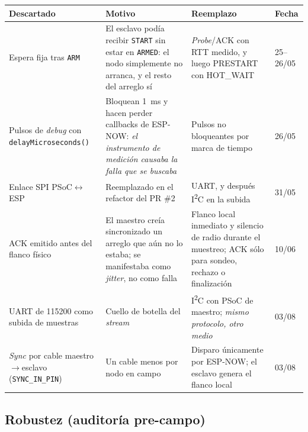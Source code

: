 \begin{center}\footnotesize
\begin{tabularx}{\textwidth}{@{}l X X l@{}}
\toprule
\textbf{Descartado} & \textbf{Motivo} & \textbf{Reemplazo} & \textbf{Fecha} \\
\midrule
Espera fija tras \texttt{ARM}
& El esclavo pod\'ia recibir \texttt{START} sin estar en \texttt{ARMED}: el nodo simplemente no arranca, y el resto del arreglo s\'i
& \emph{Probe}/ACK con RTT medido, y luego PRESTART con HOT\_WAIT
& 25--26/05 \\
\addlinespace[2pt]
Pulsos de \emph{debug} con \texttt{delayMicroseconds()}
& Bloquean \SI{1}{\milli\second} y hacen perder callbacks de ESP-NOW: \emph{el instrumento de medici\'on causaba la falla que se buscaba}
& Pulsos no bloqueantes por marca de tiempo
& 26/05 \\
\addlinespace[2pt]
Enlace SPI PSoC$\leftrightarrow$ESP
& Reemplazado en el refactor del PR \#2
& UART, y despu\'es I\textsuperscript{2}C en la subida
& 31/05 \\
\addlinespace[2pt]
ACK emitido antes del flanco f\'isico
& El maestro cre\'ia sincronizado un arreglo que a\'un no lo estaba; se manifestaba como \emph{jitter}, no como falla
& Flanco local inmediato y silencio de radio durante el muestreo; ACK s\'olo para sondeo, rechazo o finalizaci\'on
& 10/06 \\
\addlinespace[2pt]
UART de \SI{115200}{} como subida de muestras
& Cuello de botella del \emph{stream}
& I\textsuperscript{2}C con PSoC de maestro; \emph{mismo protocolo, otro medio}
& 03/08 \\
\addlinespace[2pt]
\emph{Sync} por cable maestro$\to$esclavo (\texttt{SYNC\_IN\_PIN})
& Un cable menos por nodo en campo
& Disparo \'unicamente por ESP-NOW; el esclavo genera el flanco local
& 03/08 \\
\bottomrule
\end{tabularx}
\end{center}

\subsection{Robustez (auditor\'ia pre-campo)}

